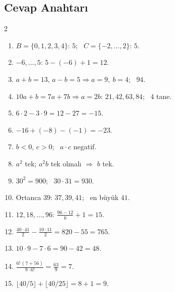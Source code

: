 \subsection*{Cevap Anahtarı}
{\small
\begin{multicols}{2}
\begin{enumerate}[label=\textbf{\arabic*.},leftmargin=*,itemsep=1pt]
\item \(B=\{0,1,2,3,4\}\): \(5\); \ \(C=\{-2,\dots,2\}\): \(5\).
\item \(-6,\dots,5\): \(5-(-6)+1=12\).
\item \(a+b=13\), \(a-b=5\Rightarrow a=9,\ b=4\); \ \(94\).
\item \(10a+b=7a+7b\Rightarrow a=2b\): \(21,42,63,84\); \ \(4\) tane.
\item \(6\cdot 2-3\cdot 9=12-27=-15\).
\item \(-16+(-8)-(-1)=-23\).
\item \(b<0\), \(c>0\); \ \(a\cdot c\) negatif.
\item \(a^2\) tek; \(a^2b\) tek olmalı \(\Rightarrow\) \(b\) tek.
\item \(30^2=900\); \ \(30\cdot 31=930\).
\item Ortanca \(39\): \(37,39,41\); \ en büyük \(41\).
\item \(12,18,\dots,96\): \(\frac{96-12}{6}+1=15\).
\item \(\frac{40\cdot 41}{2}-\frac{10\cdot 11}{2}=820-55=765\).
\item \(10\cdot 9-7\cdot 6=90-42=48\).
\item \(\frac{6!\,(7+56)}{9\cdot 6!}=\frac{63}{9}=7\).
\item \(\lfloor 40/5\rfloor+\lfloor 40/25\rfloor=8+1=9\).
\end{enumerate}
\end{multicols}}
